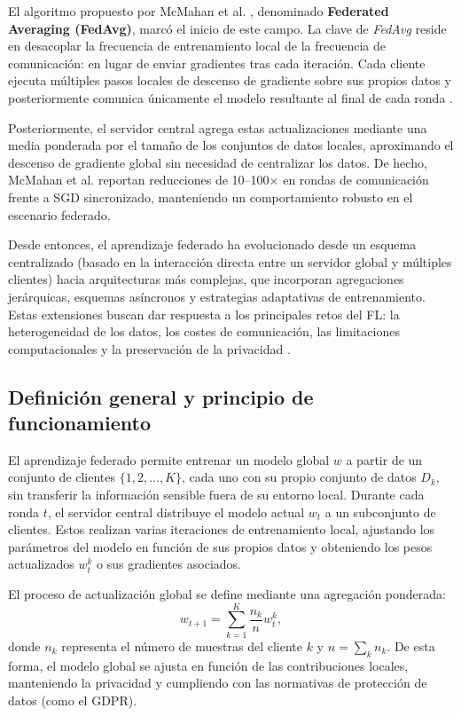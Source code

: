 \documentclass{report}
\begin{document}
El algoritmo propuesto por McMahan et al. \cite{mcmahan2017communication}\cite{pmlr-v54-mcmahan17a}, denominado \textbf{Federated Averaging (FedAvg)}, marcó el inicio de este campo. La clave de \textit{FedAvg} reside en desacoplar la frecuencia de entrenamiento local de la frecuencia de comunicación: en lugar de enviar gradientes tras cada iteración. Cada cliente ejecuta múltiples pasos locales de descenso de gradiente sobre sus propios datos y posteriormente comunica únicamente el modelo resultante al final de cada ronda \cite{mcmahan2017communication,kairouz2021advances}.

Posteriormente, el servidor central agrega estas actualizaciones mediante una media ponderada por el tamaño de los conjuntos de datos locales, aproximando el descenso de gradiente global sin necesidad de centralizar los datos.  
De hecho, McMahan et al.\cite{mcmahan2017communication} reportan reducciones de 10--100$\times$ en rondas de comunicación frente a SGD sincronizado, manteniendo un comportamiento robusto en el escenario federado.


Desde entonces, el aprendizaje federado ha evolucionado desde un esquema centralizado (basado en la interacción directa entre un servidor global y múltiples clientes) hacia arquitecturas más complejas, que incorporan agregaciones jerárquicas, esquemas asíncronos y estrategias adaptativas de entrenamiento. Estas extensiones buscan dar respuesta a los principales retos del FL: la heterogeneidad de los datos, los costes de comunicación, las limitaciones computacionales y la preservación de la privacidad \cite{kairouz2021advances,li2020federated}.

\subsection{Definición general y principio de funcionamiento}

El aprendizaje federado permite entrenar un modelo global \( w \) a partir de un conjunto de clientes \( \{1, 2, ..., K\} \), cada uno con su propio conjunto de datos \( D_k \), sin transferir la información sensible fuera de su entorno local.  
Durante cada ronda \( t \), el servidor central distribuye el modelo actual \( w_t \) a un subconjunto de clientes. Estos realizan varias iteraciones de entrenamiento local, ajustando los parámetros del modelo en función de sus propios datos y obteniendo los pesos actualizados \( w_t^k \) o sus gradientes asociados.  

El proceso de actualización global se define mediante una agregación ponderada\cite{pmlr-v54-mcmahan17a}:
\[
w_{t+1} = \sum_{k=1}^{K} \frac{n_k}{n} w_t^k,
\]
donde \( n_k \) representa el número de muestras del cliente \( k \) y \( n = \sum_k n_k \).  
De esta forma, el modelo global se ajusta en función de las contribuciones locales, manteniendo la privacidad y cumpliendo con las normativas de protección de datos (como el GDPR)\cite{rgpd2016}.
\end{document}
